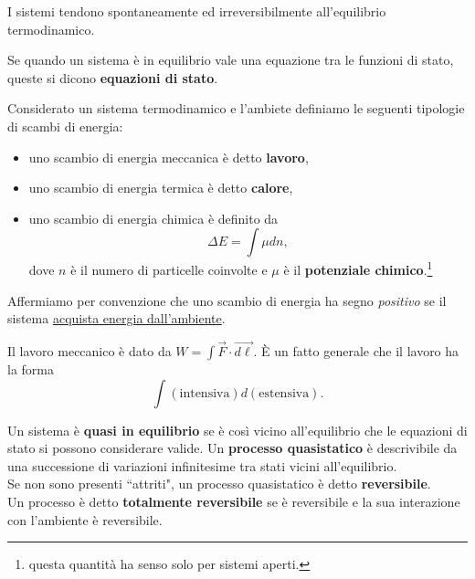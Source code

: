 \documentclass[a4paper]{report}
\begin{document}
\begin{remark}
I sistemi tendono spontaneamente ed irreversibilmente all'equilibrio termodinamico.
\end{remark}

\begin{definition}
Se quando un sistema \`e in equilibrio vale una equazione tra le funzioni di stato, queste si dicono \textbf{equazioni di stato}.
\end{definition}

\begin{definition}
Considerato un sistema termodinamico e l'ambiete definiamo le seguenti tipologie di scambi di energia:
\begin{itemize}
\item uno scambio di energia meccanica \`e detto \textbf{lavoro},
\item uno scambio di energia termica \`e detto \textbf{calore},
\item uno scambio di energia chimica \`e definito da \[\Delta E=\int \mu dn,\] dove $n$ \`e il numero di particelle coinvolte e $\mu$ \`e il \textbf{potenziale chimico}.\footnote{questa quantit\`a ha senso solo per sistemi aperti.}
\end{itemize}
Affermiamo per convenzione che uno scambio di energia ha segno \textit{positivo} se il sistema \underline{acquista energia dall'ambiente}.
\end{definition}

\begin{remark}
Il lavoro meccanico \`e dato da $W=\int \vec F\cdot \vec{d\ell}$. \`E un fatto generale che il lavoro ha la forma
\[\int(\text{intensiva})d(\text{estensiva}).\]
\end{remark}



\begin{definition}
Un sistema \`e \textbf{quasi in equilibrio} se \`e cos\`i vicino all'equilibrio che le equazioni di stato si possono considerare valide. Un \textbf{processo quasistatico} \`e descrivibile da una successione di variazioni infinitesime tra stati vicini all'equilibrio.\\
Se non sono presenti ``attriti", un processo quasistatico \`e detto \textbf{reversibile}.\\
Un processo \`e detto \textbf{totalmente reversibile} se \`e reversibile e la sua interazione con l'ambiente \`e reversibile.
\end{definition}
\end{document}
